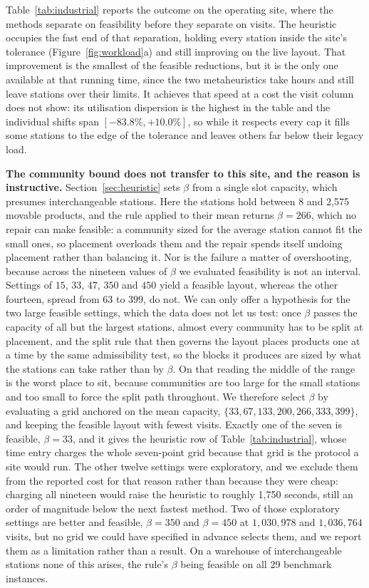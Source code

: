 \documentclass[]{interact}
\begin{document}
Table~\ref{tab:industrial} reports the outcome on the operating site, where the methods separate on feasibility before they separate on visits. The heuristic occupies the fast end of that separation, holding every station inside the site's tolerance (Figure~\ref{fig:workload}a) and still improving on the live layout. That improvement is the smallest of the feasible reductions, but it is the only one available at that running time, since the two metaheuristics take hours and still leave stations over their limits. It achieves that speed at a cost the visit column does not show: its utilisation dispersion is the highest in the table and the individual shifts span $[-83.8\%, +10.0\%]$, so while it respects every cap it fills some stations to the edge of the tolerance and leaves others far below their legacy load.

\textbf{The community bound does not transfer to this site, and the reason is instructive.} Section~\ref{sec:heuristic} sets $\beta$ from a single slot capacity, which presumes interchangeable stations. Here the stations hold between 8 and 2{,}575 movable products, and the rule applied to their mean returns $\beta=266$, which no repair can make feasible: a community sized for the average station cannot fit the small ones, so placement overloads them and the repair spends itself undoing placement rather than balancing it. Nor is the failure a matter of overshooting, because across the nineteen values of $\beta$ we evaluated feasibility is not an interval. Settings of $15$, $33$, $47$, $350$ and $450$ yield a feasible layout, whereas the other fourteen, spread from $63$ to $399$, do not. We can only offer a hypothesis for the two large feasible settings, which the data does not let us test: once $\beta$ passes the capacity of all but the largest stations, almost every community has to be split at placement, and the split rule that then governs the layout places products one at a time by the same admissibility test, so the blocks it produces are sized by what the stations can take rather than by $\beta$. On that reading the middle of the range is the worst place to sit, because communities are too large for the small stations and too small to force the split path throughout. We therefore select $\beta$ by evaluating a grid anchored on the mean capacity, $\{33,67,133,200,266,333,399\}$, and keeping the feasible layout with fewest visits. Exactly one of the seven is feasible, $\beta=33$, and it gives the heuristic row of Table~\ref{tab:industrial}, whose time entry charges the whole seven-point grid because that grid is the protocol a site would run. The other twelve settings were exploratory, and we exclude them from the reported cost for that reason rather than because they were cheap: charging all nineteen would raise the heuristic to roughly 1,750 seconds, still an order of magnitude below the next fastest method. Two of those exploratory settings are better and feasible, $\beta=350$ and $\beta=450$ at $1{,}030{,}978$ and $1{,}036{,}764$ visits, but no grid we could have specified in advance selects them, and we report them as a limitation rather than a result. On a warehouse of interchangeable stations none of this arises, the rule's $\beta$ being feasible on all 29 benchmark instances.
\end{document}
